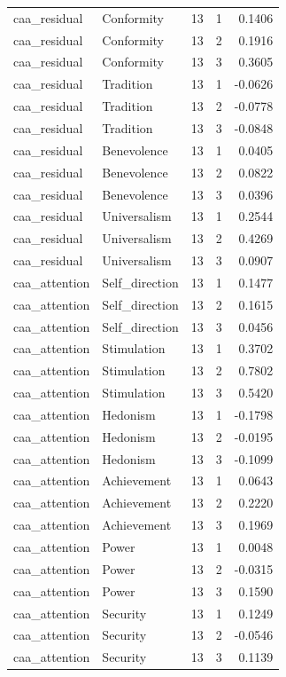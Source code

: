 \begin{tabular}{llrrr}
caa\_residual & Conformity & 13 & 1 & 0.1406 \\
caa\_residual & Conformity & 13 & 2 & 0.1916 \\
caa\_residual & Conformity & 13 & 3 & 0.3605 \\
caa\_residual & Tradition & 13 & 1 & -0.0626 \\
caa\_residual & Tradition & 13 & 2 & -0.0778 \\
caa\_residual & Tradition & 13 & 3 & -0.0848 \\
caa\_residual & Benevolence & 13 & 1 & 0.0405 \\
caa\_residual & Benevolence & 13 & 2 & 0.0822 \\
caa\_residual & Benevolence & 13 & 3 & 0.0396 \\
caa\_residual & Universalism & 13 & 1 & 0.2544 \\
caa\_residual & Universalism & 13 & 2 & 0.4269 \\
caa\_residual & Universalism & 13 & 3 & 0.0907 \\
caa\_attention & Self\_direction & 13 & 1 & 0.1477 \\
caa\_attention & Self\_direction & 13 & 2 & 0.1615 \\
caa\_attention & Self\_direction & 13 & 3 & 0.0456 \\
caa\_attention & Stimulation & 13 & 1 & 0.3702 \\
caa\_attention & Stimulation & 13 & 2 & 0.7802 \\
caa\_attention & Stimulation & 13 & 3 & 0.5420 \\
caa\_attention & Hedonism & 13 & 1 & -0.1798 \\
caa\_attention & Hedonism & 13 & 2 & -0.0195 \\
caa\_attention & Hedonism & 13 & 3 & -0.1099 \\
caa\_attention & Achievement & 13 & 1 & 0.0643 \\
caa\_attention & Achievement & 13 & 2 & 0.2220 \\
caa\_attention & Achievement & 13 & 3 & 0.1969 \\
caa\_attention & Power & 13 & 1 & 0.0048 \\
caa\_attention & Power & 13 & 2 & -0.0315 \\
caa\_attention & Power & 13 & 3 & 0.1590 \\
caa\_attention & Security & 13 & 1 & 0.1249 \\
caa\_attention & Security & 13 & 2 & -0.0546 \\
caa\_attention & Security & 13 & 3 & 0.1139 \\

\end{tabular}
